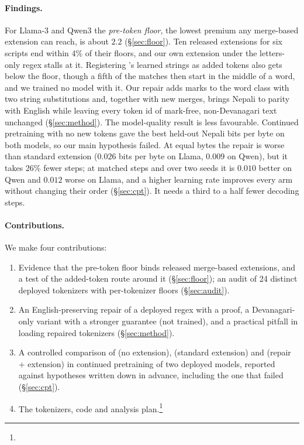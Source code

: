 \paragraph{Findings.} For Llama-3 and Qwen3 the \emph{pre-token floor}, the lowest premium any merge-based extension can reach, is about $2.2$ (\S\ref{sec:floor}). Ten released extensions for six scripts end within 4\% of their floors, and our own extension under the letters-only regex stalls at it. Registering \RII{}'s learned strings as added tokens also gets below the floor, though a fifth of the matches then start in the middle of a word, and we trained no model with it. Our repair adds marks to the word class with two string substitutions and, together with new merges, brings Nepali to parity with English while leaving every token id of mark-free, non-Devanagari text unchanged (\S\ref{sec:method}). The model-quality result is less favourable. Continued pretraining with no new tokens gave the best held-out Nepali bits per byte on both models, so our main hypothesis failed. At equal bytes the repair is worse than standard extension ($0.026$ bits per byte on Llama, $0.009$ on Qwen), but it takes 26\% fewer steps; at matched steps and over two seeds it is $0.010$ better on Qwen and $0.012$ worse on Llama, and a higher learning rate improves every arm without changing their order (\S\ref{sec:cpt}). It needs a third to a half fewer decoding steps.

\paragraph{Contributions.} We make four contributions:
\begin{enumerate}
  \setlength\itemsep{0pt}
  \item Evidence that the pre-token floor binds released merge-based extensions, and a test of the added-token route around it (\S\ref{sec:floor}); an audit of 24 distinct deployed tokenizers with per-tokenizer floors (\S\ref{sec:audit}).
  \item An English-preserving repair of a deployed regex with a proof, a Devanagari-only variant with a stronger guarantee (not trained), and a practical pitfall in loading repaired tokenizers (\S\ref{sec:method}).
  \item A controlled comparison of \RO{} (no extension), \RI{} (standard extension) and \RII{} (repair + extension) in continued pretraining of two deployed models, reported against hypotheses written down in advance, including the one that failed (\S\ref{sec:cpt}).
  \item The tokenizers, code and analysis plan.\footnote{\artifactnote}
\end{enumerate}
